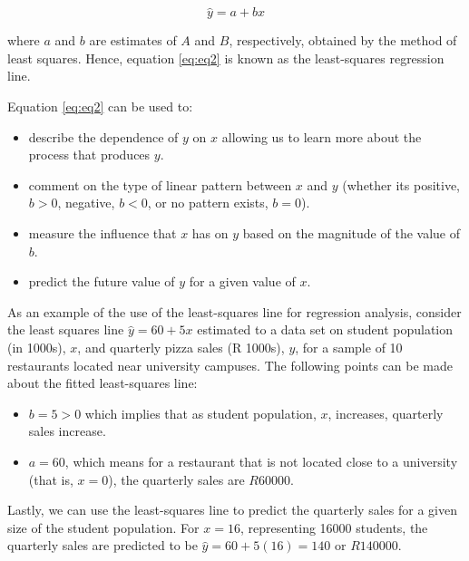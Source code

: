 \documentclass[
]{book}
\providecommand{\tightlist}{%
  \setlength{\itemsep}{0pt}\setlength{\parskip}{0pt}}
\begin{document}
\begin{equation}
\hat{y}=a+bx \label{eq:eq2}                                          
\end{equation}

where \(a\) and \(b\) are estimates of \(A\) and \(B\), respectively, obtained by the method of least squares. Hence, equation \eqref{eq:eq2} is known as the least-squares regression line.

Equation \eqref{eq:eq2} can be used to:

\begin{itemize}
\tightlist
\item
  describe the dependence of \(y\) on \(x\) allowing us to learn more about the process that produces \(y\).
\item
  comment on the type of linear pattern between \(x\) and \(y\) (whether its positive, \(b>0\), negative, \(b<0\), or no pattern exists, \(b=0\)).
\item
  measure the influence that \(x\) has on \(y\) based on the magnitude of the value of \(b\).
\item
  predict the future value of \(y\) for a given value of \(x\).
\end{itemize}

As an example of the use of the least-squares line for regression analysis, consider the least squares line \(\hat{y}=60+5x\) estimated to a data set on student population (in 1000s), \(x\), and quarterly pizza sales (R 1000s), \(y\), for a sample of 10 restaurants located near university campuses. The following points can be made about the fitted least-squares line:

\begin{itemize}
\item
  \(b=5>0\) which implies that as student population, \(x\), increases, quarterly sales increase.
\item
  \(a=60\), which means for a restaurant that is not located close to a university (that is, \(x=0\)), the quarterly sales are \(R60000\).
\end{itemize}

Lastly, we can use the least-squares line to predict the quarterly sales for a given size of the student population. For \(x=16\), representing 16000 students, the quarterly sales are predicted to be \(\hat{y}=60+5(16)=140\) or \(R140000\).
\end{document}

